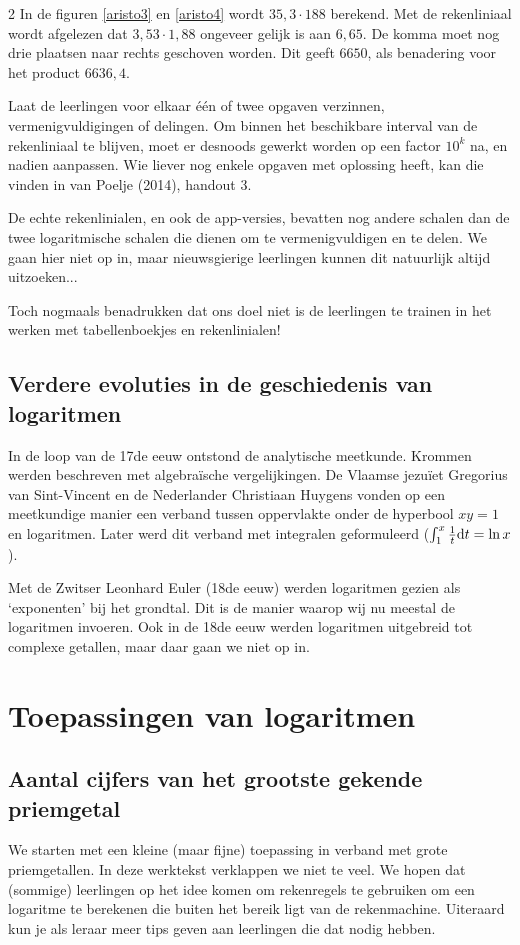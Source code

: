\begin{multicols}{2}
In de figuren \ref{aristo3} en \ref{aristo4} wordt $35,3\cdot 188$ berekend. Met de rekenliniaal wordt afgelezen dat $3,53\cdot 1,88$ ongeveer gelijk is aan $6,65$. De komma moet nog drie plaatsen naar rechts geschoven worden. Dit geeft $6650$, als benadering voor het product $6636,4$. 

Laat de leerlingen voor elkaar één of twee opgaven verzinnen, vermenigvuldigingen of delingen. Om binnen het beschikbare interval van de rekenliniaal te blijven, moet er desnoods gewerkt worden op een factor $10^k$ na, en nadien aanpassen. Wie liever nog enkele opgaven met oplossing heeft, kan die vinden in van Poelje (2014), handout 3.

De echte rekenlinialen, en ook de app-versies, bevatten nog andere schalen dan de twee logaritmische schalen die dienen om te vermenigvuldigen en te delen. We gaan hier niet op in, maar nieuwsgierige leerlingen kunnen dit natuurlijk altijd uitzoeken... 

Toch nogmaals benadrukken dat ons doel niet is de leerlingen te trainen in het werken met tabellenboekjes en rekenlinialen!

\subsection{Verdere evoluties in de geschiedenis van logaritmen}

In de loop van de 17de eeuw ontstond de analytische meetkunde. Krommen werden beschreven met algebraïsche vergelijkingen. De Vlaamse jezuïet Gregorius van Sint-Vincent en de Nederlander Christiaan Huygens vonden op een meetkundige manier een verband tussen oppervlakte onder de hyperbool $xy=1$ en logaritmen. Later werd dit verband met integralen geformuleerd ($\int_1^x \frac{1}{t} \text d t = \ln x$).

Met de Zwitser Leonhard Euler (18de eeuw) werden logaritmen gezien als `exponenten' bij het grondtal. Dit is de manier waarop wij nu meestal de logaritmen invoeren. Ook in de 18de eeuw werden logaritmen uitgebreid tot complexe getallen, maar daar gaan we niet op in.

\section{Toepassingen van logaritmen}

\subsection{Aantal cijfers van het grootste gekende priemgetal}

We starten met een kleine (maar fijne) toepassing in verband met grote priemgetallen. In deze werktekst verklappen we niet te veel. We hopen dat (sommige) leerlingen op het idee komen om rekenregels te gebruiken om een logaritme te berekenen die buiten het bereik ligt van de rekenmachine. Uiteraard kun je als leraar meer tips geven aan leerlingen die dat nodig hebben.

\end{multicols}

